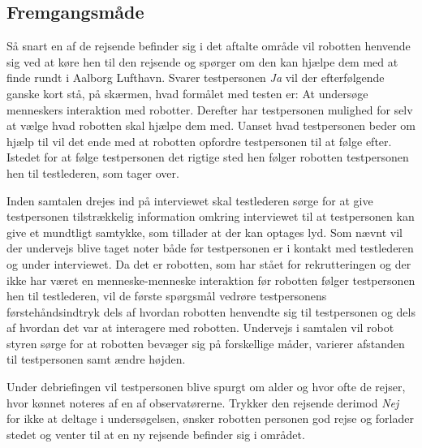 \subsection*{Fremgangsmåde}
\label{Fremgangsmaade}
%
Så snart en af de rejsende befinder sig i det aftalte område vil robotten henvende sig ved at køre hen til den rejsende og spørger om den kan hjælpe dem med at finde rundt i Aalborg Lufthavn. Svarer testpersonen \textit{Ja} vil der efterfølgende ganske kort stå, på skærmen, hvad formålet med testen er: At undersøge menneskers interaktion med robotter. Derefter har testpersonen mulighed for selv at vælge hvad robotten skal hjælpe dem med. Uanset hvad testpersonen beder om hjælp til vil det ende med at robotten opfordre testpersonen til at følge efter. Istedet for at følge testpersonen det rigtige sted hen følger robotten testpersonen hen til testlederen, som tager over. 

Inden samtalen drejes ind på interviewet skal testlederen sørge for at give testpersonen tilstrækkelig information omkring interviewet til at testpersonen kan give et mundtligt samtykke, som tillader at der kan optages lyd. Som nævnt vil der undervejs blive taget noter både før testpersonen er i kontakt med testlederen og under interviewet. \blankline
%
Da det er robotten, som har stået for rekrutteringen og der ikke har været en menneske-menneske interaktion før robotten følger testpersonen hen til testlederen, vil de første spørgsmål vedrøre testpersonens førstehåndsindtryk dels af hvordan robotten henvendte sig til testpersonen og dels af hvordan det var at interagere med robotten. Undervejs i samtalen vil robot styren sørge for at robotten bevæger sig på forskellige måder, varierer afstanden til testpersonen samt ændre højden.  

Under debriefingen vil testpersonen blive spurgt om alder og hvor ofte de rejser, hvor kønnet noteres af en af observatørerne.\blankline      
%
Trykker den rejsende derimod \textit{Nej} for ikke at deltage i undersøgelsen, ønsker robotten personen god rejse og forlader stedet og venter til at en ny rejsende befinder sig i området.



     
